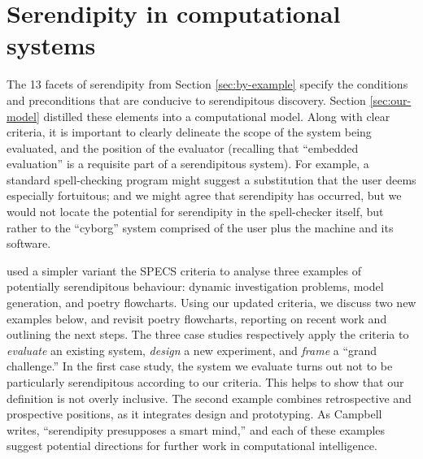 \section{Serendipity in computational systems} \label{sec:computational-serendipity}

The 13 facets of serendipity from Section \ref{sec:by-example} specify
the conditions and preconditions that are conducive to serendipitous
discovery.  Section \ref{sec:our-model} distilled these elements into
a computational model.
%
Along with clear criteria, it is important to clearly delineate the
scope of the system being evaluated, and the position of the evaluator
(recalling that ``embedded evaluation'' is a requisite part of a
serendipitous system).  For example, a standard spell-checking program
might suggest a substitution that the user deems especially
fortuitous; and we might agree that serendipity has occurred, but we
would not locate the potential for serendipity in the spell-checker
itself, but rather to the ``cyborg'' system comprised of the user plus
the machine and its software.

 used a simpler variant the SPECS criteria
to analyse three examples of potentially serendipitous behaviour:
dynamic investigation problems, model generation, and poetry
flowcharts.  Using our updated criteria, we discuss two new examples
below, and revisit poetry flowcharts, reporting on recent work and
outlining the next steps.  The three case studies respectively apply
the criteria to \emph{evaluate} an existing system, \emph{design} a
new experiment, and \emph{frame} a ``grand challenge.''  In the first
case study, the system we evaluate turns out not to be particularly
serendipitous according to our criteria.  This helps to show that our
definition is not overly inclusive.  The second example combines
retrospective and prospective positions, as it integrates design and
prototyping.  As Campbell \citeyear{campbell2005serendipity} writes,
``serendipity presupposes a smart mind,'' and each of these examples
suggest potential directions for further work in computational
intelligence.

